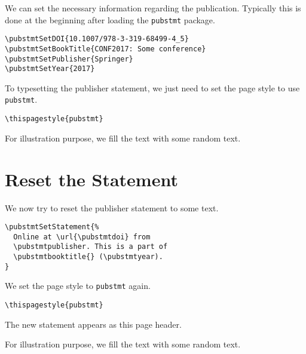 \usepackage{lipsum}


\maketitle

We can set the necessary information regarding the publication.
Typically this is done at the beginning after loading the \verb|pubstmt| package.
\begin{verbatim}
\pubstmtSetDOI{10.1007/978-3-319-68499-4_5}
\pubstmtSetBookTitle{CONF2017: Some conference}
\pubstmtSetPublisher{Springer}
\pubstmtSetYear{2017}
\end{verbatim}
To typesetting the publisher statement, we just need to set the page
style to use \verb|pubstmt|.
\begin{verbatim}
\thispagestyle{pubstmt}
\end{verbatim}
\thispagestyle{pubstmt}

For illustration purpose, we fill the text with some random text.
\begin{quote}
  \lipsum
\end{quote}

\section{Reset the Statement}
\label{sec:reset-statement}

We now try to reset the publisher statement to some text.
\begin{verbatim}
\pubstmtSetStatement{%
  Online at \url{\pubstmtdoi} from 
  \pubstmtpublisher. This is a part of
  \pubstmtbooktitle{} (\pubstmtyear).
}
\end{verbatim}
 We set the page style to \verb|pubstmt| again.
\begin{verbatim}
\thispagestyle{pubstmt}
\end{verbatim}
\thispagestyle{pubstmt}
The new statement appears as this page header.

For illustration purpose, we fill the text with some random text.
\begin{quote}
  \lipsum
\end{quote}


